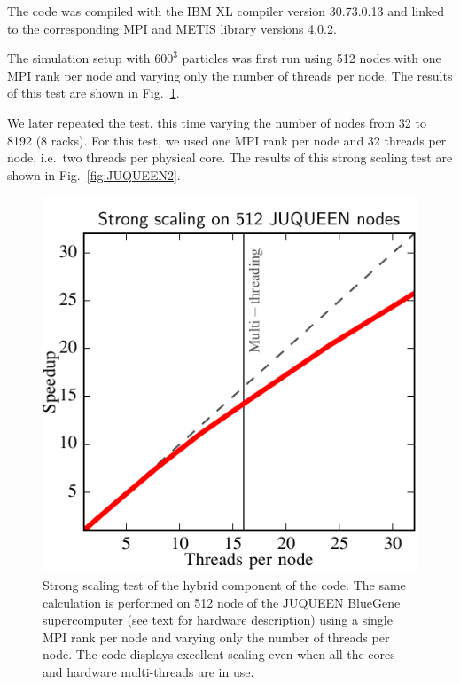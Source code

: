 \documentclass{sig-alternate-05-2015}
\begin{document}
The code was compiled with the IBM XL compiler version \textsc{30.73.0.13} and
linked to the corresponding MPI and METIS library
versions \textsc{4.0.2}.

The simulation setup with $600^3$ particles was first run using
512 nodes with one MPI rank per node and varying only the number of threads per
node. The results of this test are shown in Fig.~\ref{fig:JUQUEEN1}.

We later repeated the test, this time varying the number of nodes from 32 to
8192 (8 racks).  For this test, we used one MPI rank per node and 32 threads per
node, i.e.~two threads per physical core. The results of this strong scaling
test are shown in Fig.~\ref{fig:JUQUEEN2}.


\begin{figure}
\centering
\includegraphics[width=\columnwidth]{Figures/scalingInNode}
\caption{Strong scaling test of the hybrid component of the code. The
  same calculation is performed on 512 node of the JUQUEEN BlueGene
  supercomputer (see text for hardware description) using a single MPI
  rank per node and varying only the number of
  threads per node. The code displays excellent scaling even when all the cores and
  hardware multi-threads are in use. \label{fig:JUQUEEN1}}
\end{figure}  
\end{document}
